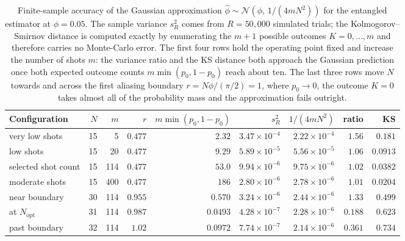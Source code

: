 \begin{table}[htbp]
  \centering
  \footnotesize
  \setlength{\tabcolsep}{4pt}
  \caption{Finite-sample accuracy of the Gaussian approximation $\hat\phi\sim\mathcal{N}(\phi,\,1/(4mN^2))$ for the entangled estimator at $\phi=0.05$. The sample variance $s_R^2$ comes from $R=50{,}000$ simulated trials; the Kolmogorov--Smirnov distance is computed exactly by enumerating the $m+1$ possible outcomes $K=0,\dots,m$ and therefore carries no Monte-Carlo error. The first four rows hold the operating point fixed and increase the number of shots $m$: the variance ratio and the KS distance both approach the Gaussian prediction once both expected outcome counts $m\min(p_0,1-p_0)$ reach about ten. The last three rows move $N$ towards and across the first aliasing boundary $r=N\phi/(\pi/2)=1$, where $p_0\to 0$, the outcome $K=0$ takes almost all of the probability mass and the approximation fails outright.}
  \label{tab:gaussianity}
  \begin{tabular}{lrrrrrrrr}
    \toprule
    Configuration & $N$ & $m$ & $r$ & $m\min(p_0,1-p_0)$ & $s_R^2$ & $1/(4mN^2)$ & ratio & KS \\
    \midrule
    very low shots & 15 & 5 & $0.477$ & $2.32$ & $3.47\times 10^{-4}$ & $2.22\times 10^{-4}$ & $1.56$ & $0.181$ \\
    low shots & 15 & 20 & $0.477$ & $9.29$ & $5.89\times 10^{-5}$ & $5.56\times 10^{-5}$ & $1.06$ & $0.0913$ \\
    selected shot count & 15 & 114 & $0.477$ & $53.0$ & $9.94\times 10^{-6}$ & $9.75\times 10^{-6}$ & $1.02$ & $0.0382$ \\
    moderate shots & 15 & 400 & $0.477$ & $186$ & $2.80\times 10^{-6}$ & $2.78\times 10^{-6}$ & $1.01$ & $0.0204$ \\
    \midrule
    near boundary & 30 & 114 & $0.955$ & $0.570$ & $3.24\times 10^{-6}$ & $2.44\times 10^{-6}$ & $1.33$ & $0.499$ \\
    at $N_{\mathrm{opt}}$ & 31 & 114 & $0.987$ & $0.0493$ & $4.28\times 10^{-7}$ & $2.28\times 10^{-6}$ & $0.188$ & $0.623$ \\
    past boundary & 32 & 114 & $1.02$ & $0.0972$ & $7.74\times 10^{-7}$ & $2.14\times 10^{-6}$ & $0.361$ & $0.734$ \\
    \bottomrule
  \end{tabular}
\end{table}

